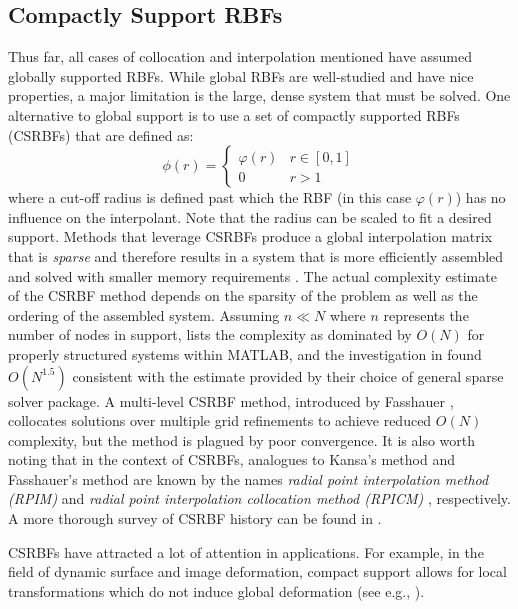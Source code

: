 \documentclass[11pt]{report}
\begin{document}
{\subsection{Compactly Support RBFs} 

Thus far, all cases of collocation and interpolation mentioned have assumed globally supported RBFs. While global RBFs are well-studied and have nice properties, a major limitation is the large, dense system that must be solved. One alternative to global support is to use a set of compactly supported RBFs (CSRBFs) that are defined as: 
\begin{equation}
\phi(r) = \begin{cases} \varphi(r) & r \in [0,1]\\
0 & r > 1
\end{cases}
\label{eqn:csrbf}
\end{equation}
where a cut-off radius is defined past which the RBF (in this case $\varphi(r)$) has no influence on the interpolant. Note that the radius can be scaled to fit a desired support. Methods that leverage CSRBFs produce a global interpolation matrix that is \emph{sparse} and therefore results in a system that is more efficiently assembled and solved with smaller memory requirements \cite{Fasshauer2007}. The actual complexity estimate of the CSRBF method depends on the sparsity of the problem as well as the ordering of the assembled system. Assuming $n \ll N$ where $n$ represents the number of nodes in support, \cite{Zhang2004} lists the complexity as dominated by $O(N)$ for properly structured systems within MATLAB, and the investigation in \cite{Morse2005} found $O(N^{1.5})$ consistent with the estimate provided by their choice of general sparse solver package. A multi-level CSRBF method, introduced by Fasshauer \cite{Fasshauer2007}, collocates solutions over multiple grid refinements to achieve reduced $O(N)$ complexity, but the method is plagued by poor convergence. It is also worth noting that in the context of CSRBFs, analogues to Kansa's method and Fasshauer's method are known by the names \emph{radial point interpolation method (RPIM)} \cite{Wang2002} and \emph{radial point interpolation collocation method (RPICM)} \cite{Liu2005}, respectively. A more thorough survey of CSRBF history can be found in \cite{Fasshauer2007,Iske2004}.

CSRBFs have attracted a lot of attention in applications. For example, in the field of dynamic surface and image deformation, compact support allows for local transformations which do not induce global deformation (see e.g., \cite{Yang2008, Lin2009, Correa2007}). 




}
\end{document}
